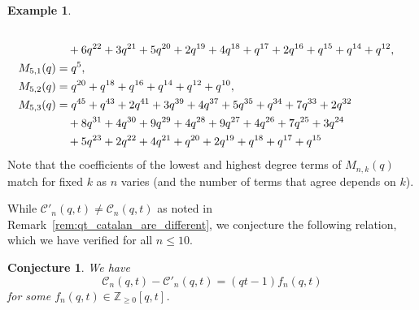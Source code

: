 \documentclass[11pt, leqno]{amsart}
\theoremstyle{plain}
\newtheorem{conjecture}[theorem]{Conjecture}
\theoremstyle{definition}
\newtheorem{example}[theorem]{Example}
\numberwithin{equation}{section}
\newcommand{\Cat}{\mathcal{C}} %
\newcommand{\Z}{\mathbb{Z}}
\begin{document}
\begin{example}
\begin{align*}
\allowdisplaybreaks   \\ & \hspace{10pt} + 6 q^{22} + 3 q^{21} + 5 q^{20} + 2 q^{19} + 4 q^{18} + q^{17} + 2 q^{16} + q^{15} + q^{14} + q^{12},
\allowdisplaybreaks \\ M_{5,1}(q) & = q^{5},
\allowdisplaybreaks \\ M_{5,2}(q) & = q^{20} + q^{18} + q^{16} + q^{14} + q^{12} + q^{10},
\allowdisplaybreaks \\ M_{5,3}(q) & = q^{45} + q^{43} + 2 q^{41} + 3 q^{39} + 4 q^{37} + 5 q^{35} + q^{34} + 7 q^{33} + 2 q^{32}
\allowdisplaybreaks \\ & \hspace{10pt} + 8 q^{31} + 4 q^{30} + 9 q^{29} + 4 q^{28} + 9 q^{27} + 4 q^{26} + 7 q^{25} + 3 q^{24}
\allowdisplaybreaks \\ & \hspace{10pt} + 5 q^{23} + 2 q^{22} + 4 q^{21} + q^{20} + 2 q^{19} + q^{18} + q^{17} + q^{15}
\end{align*}
Note that the coefficients of the lowest and highest degree terms of $M_{n,k}(q)$ match for fixed $k$ as $n$ varies (and the number of terms that agree depends on $k$).
\end{example}

While $\Cat'_n(q,t) \neq \Cat_n(q,t)$ as noted in Remark~\ref{rem:qt_catalan_are_different}, we conjecture the following relation, which we have verified for all $n \leq 10$.

\begin{conjecture}
We have
\[
\Cat_n(q,t) - \Cat'_n(q,t) = (qt - 1) f_n(q,t)
\]
for some $f_n(q,t) \in \Z_{\geq 0}[q,t]$.
\end{conjecture}
\end{document}
